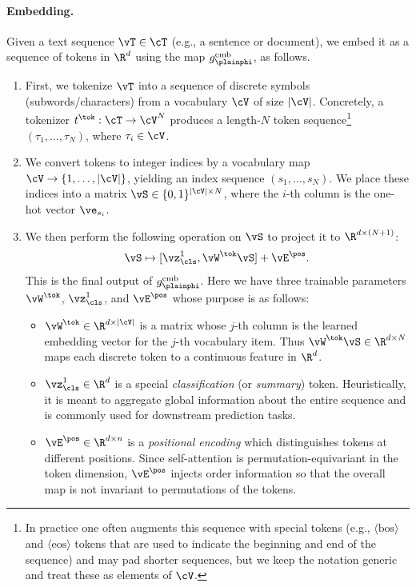 \documentclass[../../book-main.tex]{subfiles}
\begin{document}
\paragraph{Embedding.} Given a text sequence \(\vT \in \cT\) (e.g., a
sentence or document), we embed it as a sequence of tokens in
\(\R^d\) using the map \(g_{\plainphi}^{\text{emb}}\), as follows.
\begin{enumerate}
\item First, we tokenize \(\vT\) into a sequence of discrete
    symbols (subwords/characters) from a vocabulary \(\cV\) of
    size \(|\cV|\). Concretely, a tokenizer
    \(t^{\tok} : \cT \to \cV^{N}\) produces a length-\(N\) token
    sequence\footnote{In practice one often augments this
        sequence with special tokens (e.g., \(\langle \text{bos}\rangle\) and
            \(\langle \text{eos}\rangle\)
            tokens that are used to indicate the beginning and end of the
        sequence) and may pad shorter sequences, but we keep the notation
    generic and treat these as elements of \(\cV\).}
    \((\tau_{1},\dots,\tau_{N})\), where
    \(\tau_i \in \cV\).
\item We convert tokens to integer indices by a vocabulary map
    \(\cV\to\{1,\dots,|\cV|\}\), yielding an index
    sequence \((s_{1},\dots,s_{N})\). We place these indices into
    a matrix \(\vS \in \{0,1\}^{|\cV|\times N}\), where the
    \(i\)-th column is the one-hot vector \(\ve_{s_i}\).
\item We then perform the following operation on \(\vS\) to project
    it to \(\R^{d \times (N+1)}\):
    \begin{equation}
        \vS \mapsto [\vz_{\cls}^{1}, \vW^{\tok}\vS] + \vE^{\pos}.
    \end{equation}
    This is the final output of \(g_{\plainphi}^{\text{emb}}\). Here
    we have three trainable parameters \(\vW^{\tok}\),
    \(\vz_{\cls}^{1}\), and \(\vE^{\pos}\) whose purpose is as follows:
    \begin{itemize}
        \item \(\vW^{\tok} \in \R^{d \times |\cV|}\) is a matrix
            whose \(j\)-th column is the learned embedding vector
            for the \(j\)-th vocabulary item. Thus \(\vW^{\tok}\vS
            \in \R^{d\times N}\) maps each discrete token to a
            continuous feature in \(\R^{d}\).
        \item \(\vz_{\cls}^{1} \in \R^{d}\) is a special
            \textit{classification} (or \textit{summary}) token.
            Heuristically, it is meant to aggregate global
            information about the entire sequence and is commonly
            used for downstream prediction tasks.
        \item \(\vE^{\pos} \in \R^{d \times n}\) is a
            \textit{positional encoding} which distinguishes
            tokens at different positions. Since self-attention
            is permutation-equivariant in the token dimension,
            \(\vE^{\pos}\) injects order information so that the
            overall map is not invariant to permutations of the
            tokens.
    \end{itemize}
\end{enumerate}
\end{document}
